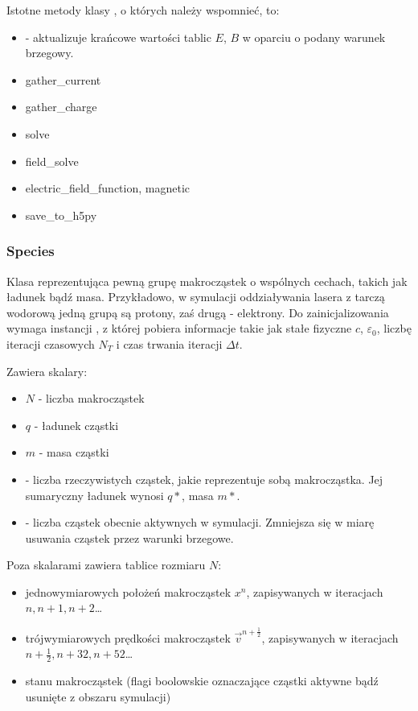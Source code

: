 {    Istotne metody klasy , o których należy wspomnieć, to:
    \begin{itemize}
         \item {} - aktualizuje krańcowe wartości tablic $E$, $B$
             w oparciu o podany warunek brzegowy.
         \item gather\_current 
         \item gather\_charge
         \item solve
         \item field\_solve
         \item electric\_field\_function, magnetic
         \item save\_to\_h5py
    \end{itemize}

    \subsubsection{Species}
    Klasa reprezentująca pewną grupę makrocząstek o wspólnych cechach, takich
    jak ładunek bądź masa.  Przykładowo, w symulacji oddziaływania lasera z
    tarczą wodorową jedną grupą są protony, zaś drugą - elektrony.  Do
    zainicjalizowania wymaga instancji , z której pobiera informacje
    takie jak stałe fizyczne $c$, $\varepsilon_0$, liczbę iteracji czasowych
    $N_T$ i czas trwania iteracji $\Delta t$.

    Zawiera skalary:
    \begin{itemize}
        \item $N$ - liczba makrocząstek
        \item $q$ - ładunek cząstki
        \item $m$ - masa cząstki
        \item {} - liczba rzeczywistych cząstek, jakie reprezentuje
            sobą makrocząstka. Jej sumaryczny ładunek wynosi $q *
            $, masa $m * $.
        \item {} - liczba cząstek obecnie aktywnych w symulacji.
            Zmniejsza się w miarę usuwania cząstek przez warunki brzegowe.
    \end{itemize}

    Poza skalarami zawiera tablice rozmiaru $N$:
    \begin{itemize}
        \item jednowymiarowych położeń makrocząstek $x^n$, zapisywanych w
            iteracjach $n, n+1, n+2$\ldots
        \item trójwymiarowych prędkości makrocząstek $\vec{v}^{n+\frac{1}{2}}$,
            zapisywanych w iteracjach $n+\frac{1}{2}, n+{3}{2}, n+{5}{2}$\ldots
        \item stanu makrocząstek (flagi boolowskie oznaczające cząstki aktywne
            bądź usunięte z obszaru symulacji)
    \end{itemize}

}
